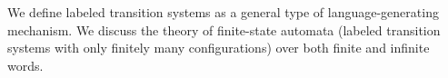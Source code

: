 \documentclass[../../diss.tex]{subfiles}
\begin{document}
We define labeled transition systems as a general type of language-generating mechanism.
We discuss the theory of finite-state automata (labeled transition systems with only finitely many configurations) over both finite and infinite words.
\end{document}
